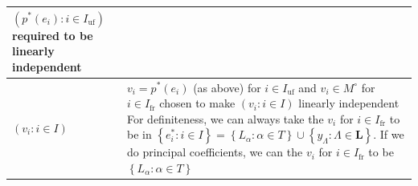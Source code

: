 \documentclass{amsart}
\newtheorem{lemma}[proposition]{Lemma}
\theoremstyle{definition}
\theoremstyle{remark}
\numberwithin{equation}{section}
\newcommand{\uf}{{\operatorname{uf}}}
\newcommand{\fr}{{\operatorname{fr}}}
\newcommand{\set}[1]{{\left\lbrace #1 \right\rbrace}}
\newcommand{\0}{{\mathbf{0}}}
\renewcommand{\L}{\mathbf{L}}
\begin{document}
\begin{longtable}{P{88.5pt}|P{248pt}}
$(p^*(e_i):i\in I_\uf)$ required to be linearly independent\\\hline
$(v_i:i\in I)$&$v_i=p^*(e_i)$ (as above) for $i\in I_\uf$ and
$v_i\in M^\circ$ for $i\in I_\fr$ chosen to make $(v_i:i\in I)$ linearly independent\newline
For definiteness, we can always take the $v_i$ for $i\in I_\fr$ to be in $\set{e^*_i:i\in I}=\set{L_\alpha:\alpha\in T}\cup\set{y_\Lambda:\Lambda\in\L}$.\newline
If we do principal coefficients, we can the $v_i$ for $i\in I_\fr$ to be $\set{L_\alpha:\alpha\in T}$\\\hline
\end{longtable}

%
%
%
%
%
%
\end{document}
